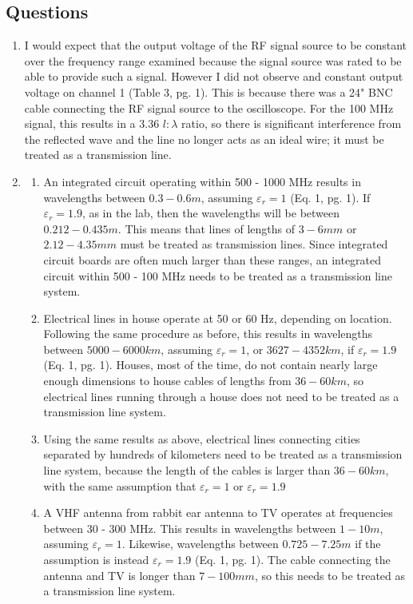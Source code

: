 \documentclass{article}
\begin{document}
\subsection{Questions}
\begin{enumerate}
	\item I would expect that the output voltage of the RF signal source to be constant over the frequency range examined because the signal source was rated to be able to provide such a signal. However I did not observe and constant output voltage on channel 1 (Table 3, pg. 1). This is because there was a 24" BNC cable connecting the RF signal source to the oscilloscope. For the 100 MHz signal, this results in a 3.36 $l:\lambda$ ratio, so there is significant interference from the reflected wave and the line no longer acts as an ideal wire; it must be treated as a transmission line. 
	\item 
	\begin{enumerate}
		\item An integrated circuit operating within 500 - 1000 MHz results in wavelengths between $0.3 - 0.6 m$, assuming $\varepsilon_r = 1$ (Eq. 1, pg. 1). If $\varepsilon_r = 1.9$, as in the lab, then the wavelengths will be between $0.212 - 0.435 m$. This means that lines of lengths of $3 - 6mm$ or $2.12 - 4.35mm$ must be treated as transmission lines. Since integrated circuit boards are often much larger than these ranges, an integrated circuit within 500 - 100 MHz needs to be treated as a transmission line system.
		\item Electrical lines in house operate at 50 or 60 Hz, depending on location. Following the same procedure as before, this results in wavelengths between $5000 - 6000 km$, assuming $\varepsilon_r = 1$, or $3627 - 4352 km$, if $\varepsilon_r = 1.9$ (Eq. 1, pg. 1). Houses, most of the time, do not contain nearly large enough dimensions to house cables of lengths from $36 - 60km$, so electrical lines running through a house does not need to be treated as a transmission line system.
		\item Using the same results as above, electrical lines connecting cities separated by hundreds of kilometers need to be treated as a transmission line system, because the length of the cables is larger than $36 - 60km$, with the same assumption that $\varepsilon_r = 1$ or $\varepsilon_r = 1.9$
		\item A VHF antenna from rabbit ear antenna to TV operates at frequencies between 30 - 300 MHz. This results in wavelengths between $1 - 10m$, assuming $\varepsilon_r = 1$. Likewise, wavelengths between $0.725 - 7.25m$ if the assumption is instead $\varepsilon_r = 1.9$ (Eq. 1, pg. 1). The cable connecting the antenna and TV is longer than $7 - 100mm$, so this needs to be treated as a transmission line system.

\end{enumerate}
\end{enumerate}
\end{document}
